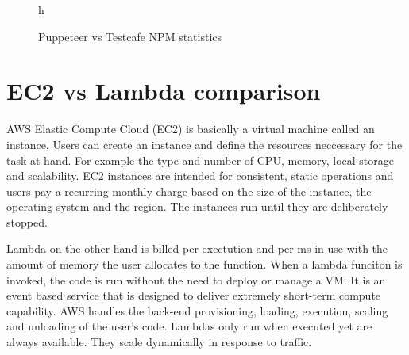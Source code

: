 \documentclass[12pt,a4paper,titlepage]{report}
\begin{document}
\begin{figure}{h}
 \centering
 \qquad
 \caption{Puppeteer vs Testcafe NPM statistics}
\end{figure}

\section{EC2 vs Lambda comparison}

AWS Elastic Compute Cloud (EC2) is basically a virtual machine called an instance. Users can create an instance and define
the resources neccessary for the task at hand. For example the type and number of CPU, memory, local storage and scalability. EC2 instances
are intended for consistent, static operations and users pay a recurring monthly charge based on the size of the instance, the operating
system and the region. The instances run until they are deliberately stopped.

Lambda on the other hand is billed per exectution and per ms in use with the amount of memory the user allocates to the function.
When a lambda funciton is invoked, the code is run without the need to deploy or manage a VM\@. It is an event based service that is
designed to deliver extremely short-term compute capability. AWS handles the back-end provisioning, loading, execution, scaling and unloading of the user's code.
Lambdas only run when executed yet are always available. They scale dynamically in response to traffic.
\end{document}
